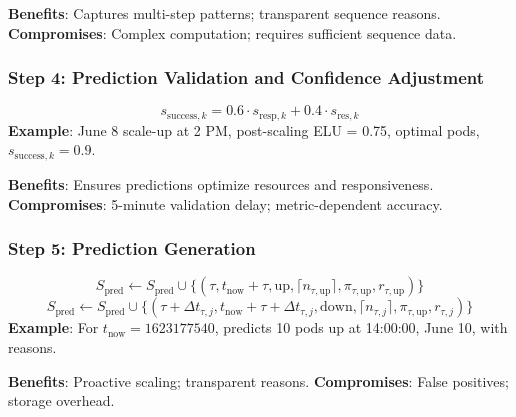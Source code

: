 \documentclass[12pt]{article}
\begin{document}
\textbf{Benefits}: Captures multi-step patterns; transparent sequence reasons.
\textbf{Compromises}: Complex computation; requires sufficient sequence data.

\subsubsection{Step 4: Prediction Validation and Confidence Adjustment}
\[
s_{\text{success},k} = 0.6 \cdot s_{\text{resp},k} + 0.4 \cdot s_{\text{res},k}
\]
\textbf{Example}: June 8 scale-up at 2 PM, post-scaling ELU = 0.75, optimal pods, \( s_{\text{success},k} = 0.9 \).

\textbf{Benefits}: Ensures predictions optimize resources and responsiveness.
\textbf{Compromises}: 5-minute validation delay; metric-dependent accuracy.

\subsubsection{Step 5: Prediction Generation}
\[
S_{\text{pred}} \gets S_{\text{pred}} \cup \{(\tau, t_{\text{now}} + \tau, \text{up}, \lceil n_{\tau,\text{up}} \rceil, \pi_{\tau,\text{up}}, r_{\tau,\text{up}})\}
\]
\[
S_{\text{pred}} \gets S_{\text{pred}} \cup \{(\tau + \Delta t_{\tau,j}, t_{\text{now}} + \tau + \Delta t_{\tau,j}, \text{down}, \lceil n_{\tau,j} \rceil, \pi_{\tau,\text{up}}, r_{\tau,j})\}
\]
\textbf{Example}: For \( t_{\text{now}} = 1623177540 \), predicts 10 pods up at 14:00:00, June 10, with reasons.

\textbf{Benefits}: Proactive scaling; transparent reasons.
\textbf{Compromises}: False positives; storage overhead.
\end{document}
